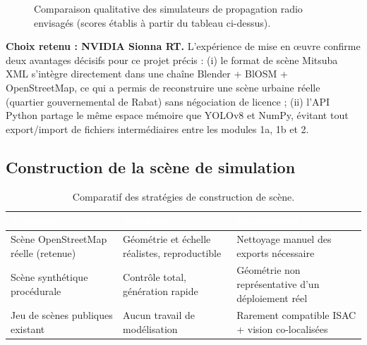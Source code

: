 \documentclass[12pt,a4paper,titlepage]{article}
\newcommand{\hd}[1]{\textcolor{white}{\textbf{#1}}}
\newcommand{\choix}{\rowcolor{tabchoice}}
\begin{document}
\begin{figure}[H]
    \centering
    \caption{Comparaison qualitative des simulateurs de propagation radio envisagés (scores établis à partir du tableau ci-dessus).}
    \label{fig:chart_simulateur}
\end{figure}

\textbf{Choix retenu : NVIDIA Sionna RT.} L'expérience de mise en \oe uvre confirme deux avantages décisifs pour ce projet précis : (i) le format de scène Mitsuba XML s'intègre directement dans une chaîne Blender + BlOSM + OpenStreetMap, ce qui a permis de reconstruire une scène urbaine réelle (quartier gouvernemental de Rabat) sans négociation de licence ; (ii) l'API Python partage le même espace mémoire que YOLOv8 et NumPy, évitant tout export/import de fichiers intermédiaires entre les modules 1a, 1b et 2.

\subsection{Construction de la scène de simulation}

\begin{table}[H]
    \centering
    \caption{Comparatif des stratégies de construction de scène.}
    \begin{tabularx}{\textwidth}{F{4cm}LL}
        \toprule
        \hd{Approche} & \hd{Avantage} & \hd{Inconvénient} \\
        \midrule
        \choix Scène OpenStreetMap réelle (retenue) & Géométrie et échelle réalistes, reproductible & Nettoyage manuel des exports nécessaire \\
        Scène synthétique procédurale & Contrôle total, génération rapide & Géométrie non représentative d'un déploiement réel \\
        Jeu de scènes publiques existant & Aucun travail de modélisation & Rarement compatible ISAC + vision co-localisées \\
        \bottomrule
    \end{tabularx}
\end{table}
\end{document}
